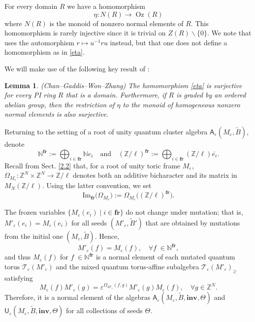 \documentclass[11pt]{amsart}
\theoremstyle{plain}
\newtheorem{lemma}[theorem]{Lemma}
\newcommand \ble[1] { \begin{lemma}\label{l#1} }
\newcommand {\ele} { \end{lemma} }
\def \Zset {{\mathbb Z}}
\def \Nset {{\mathbb N}}
\def \A {{\boldsymbol{\mathsf A}}}
\def \U {{\boldsymbol{\mathsf U}}}
\def \B  {{\widetilde{B}}}
\newcommand \fr {{\mathbf{fr}}}
\newcommand \inv {{\mathbf{inv}}}
\def \TT {{\mathcal{T}}}
\def \Om {\Omega}
\def \ep {\varepsilon}
\def \ol {\overline}
\DeclareMathOperator \Oz { {\mathrm{Oz}}}
\renewcommand \Im { {\mathrm{Im}} }
\begin{document}
For every domain $R$ we have a homomorphism 
\begin{equation}
\label{eta}
\eta: N(R) \to \Oz(R) 
\end{equation}
where $N(R)$ is the monoid of nonzero normal elements of $R$. This homomorphism is rarely injective since it is trivial on $Z(R) \backslash \{ 0 \}$. We note that \cite{CGWZ2} uses the automorphism $r \mapsto u^{-1} r u$ instead, but that one does not define a homomorphism as in \eqref{eta}.

We will make use of the following key result of \cite{CGWZ2}:

\ble{CGWZ2} (Chan--Gaddis--Won--Zhang) \cite[Lemma 1.9]{CGWZ2} 
The homomorphism \eqref{eta} is surjective for every PI ring $R$ that is a domain. Furthermore, if $R$ is graded by an ordered abelian group, then the restriction of $\eta$ to the monoid of homogeneous nonzero normal elements is also surjective. 
\ele

Returning to the setting of a root of unity quantum cluster algebra $\A_\ep(M_\ep, \B)$, denote 
\[
\Nset^\fr := \bigoplus_{i \in \fr} \Nset e_i
\quad \mbox{and} \quad 
(\Zset/\ell)^\fr := \bigoplus_{i \in \fr} (\Zset/\ell) \ol{e_i}.
\]
Recall from Sect. \ref{2.2} that, for a root of unity toric frame $M_\ep$, $\Om_{M_\ep} : \Zset^N \times \Zset^N \to \Zset/\ell$ denotes both an additive bicharacter and its matrix in $M_N(\Zset/\ell)$. Using the latter convention, we set
\begin{equation}
\label{Om-fr}
\Im_{\fr} \big( \Om_{M_\ep} \big) := \Om_{M_\ep} \big( (\Zset/\ell)^\fr \big).
\end{equation}

The frozen variables $\{ M_\ep(e_i) \mid i \in \fr \}$ do not change under mutation; that is, $M'_\ep(e_i) = M_\ep(e_i)$ for all seeds $(M'_\ep, \B')$ that are obtained by mutations from the initial one $(M_\ep, \B)$. Hence, 
\[
M'_\ep(f) = M_\ep(f), \quad \forall f \; \in \Nset^\fr,
\]
and thus $M_\ep(f)$ for $ f \; \in \Nset^\fr$ is a normal element of each mutated quantum torus $\TT_\ep(M'_\ep)$ 
and the mixed quantum torus-affine subalgebra 
$\TT_\ep(M'_\ep)_{\geq}$
satisfying 
\begin{equation}
\label{Mepfg}
M_\ep(f) M'_\ep(g) = \ep^{\Om_{M'_\ep}(f,g)} M'_\ep(g) M_\ep(f), 
\quad \forall g \in \Zset^N.
\end{equation}
Therefore, it is a normal element of the algebras $\A_\ep(M_\ep, \B, \inv, \Theta)$ and $\U_\ep(M_\ep, \B, \inv, \Theta)$ for all collections of seeds $\Theta$. 
\end{document}
